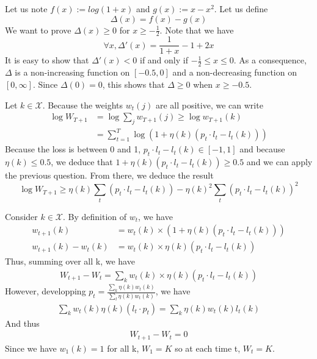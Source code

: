 
 Let us note $f(x) := log(1 + x)$ and $g(x) := x - x^2$. Let us define 
\begin{equation*}
\Delta(x) = f(x) - g(x)
\end{equation*} 
We want to prove $\Delta(x) \geqslant 0$ for $x \geqslant - \frac{1}{2}$. Note that we have
\begin{equation*}
	\forall x, \Delta'(x) = \frac{1}{1 + x} - 1 + 2x
\end{equation*}
It is easy to show that $\Delta'(x) < 0$ if and only if $-\frac{1}{2} \leqslant x \leqslant 0$. As a consequence, $\Delta$ is a non-increasing function on $[-0.5, 0]$ and a non-decreasing function on $[0, \infty]$. Since $\Delta(0) = 0$, this shows that $\Delta \geqslant 0$ when $x \geqslant -0.5$.

 Let $k \in \mathcal{X}$. Because the weights $w_t(j)$ are all positive, we can write
\begin{align*}
	\log{W_{T+1}} &= \log{\sum_j w_{T+1}(j)} \geqslant \log { w_{T+1}(k)} \\
	&= \sum_{t=1}^T \log{\left( 1 + \eta(k)(p_t \cdot{} l_t - l_t(k))\right)}
\end{align*}
Because the loss is between 0 and 1, $p_t \cdot{} l_t - l_t(k) \in [-1, 1]$ and because $\eta(k) \leqslant 0.5$, we deduce that $1 + \eta(k)(p_t \cdot{} l_t - l_t(k)) \geqslant 0.5$ and we can apply the previous question. From there, we deduce the result 
\begin{equation*}
	\log{W_{T+1}} \geqslant \eta(k) \sum_t (p_t \cdot l_t - l_t(k)) - \eta(k)^2 \sum_t (p_t \cdot l_t - l_t(k))^2
\end{equation*}

 Consider $k \in \mathcal{X}$. By definition of $w_t$, we have
\begin{align*}
	w_{t+1}(k) &= w_t(k) \times \left( 1 + \eta(k) ( p_t \cdot l_t - l_t(k))  \right) \\
	w_{t+1}(k) - w_t(k) & = w_t(k) \times \eta(k)  ( p_t \cdot l_t - l_t(k)) 
\end{align*}
Thus, summing over all k, we have
\begin{align*}
	W_{t+1} - W_t = \sum_k w_t(k) \times \eta(k) ( p_t \cdot l_t - l_t(k))
\end{align*}
However, developping $p_t = \frac{\sum_k \eta(k)w_t(k)}{\sum_l \eta(k)w_t(k)}$, we have  
\begin{align*}
\sum_k w_t(k) \eta(k) (l_t \cdot p_t) = \sum_k \eta(k) w_t(k) l_t(k)
\end{align*}
And thus 
\begin{align*}
	W_{t+1} - W_t = 0
\end{align*}
Since we have $w_1(k) = 1$ for all k, $W_1 = K$ so at each time t, $W_t = K$.

